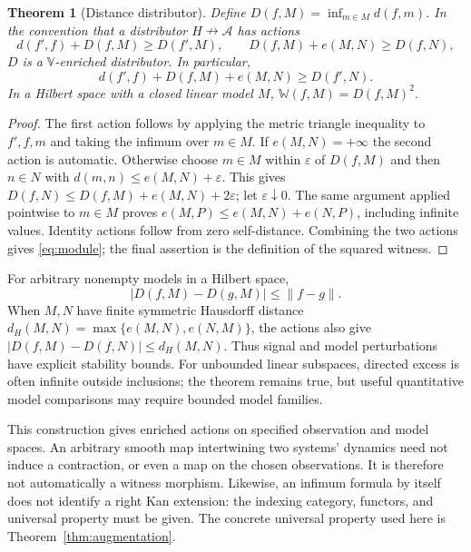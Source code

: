 \documentclass[11pt,letterpaper]{article}
\newtheorem{theorem}{Theorem}[section]
\newcommand{\WW}{\mathbb W}
\begin{document}
\begin{theorem}[Distance distributor]\label{thm:distributor}
Define $D(f,M)=\inf_{m\in M}d(f,m)$. In the convention that a distributor
$H\nrightarrow\mathcal A$ has actions
\[
d(f',f)+D(f,M)\ge D(f',M),\qquad
D(f,M)+e(M,N)\ge D(f,N),
\]
$D$ is a $\mathbb V$-enriched distributor. In particular,
\begin{equation}\label{eq:module}
d(f',f)+D(f,M)+e(M,N)\ge D(f',N).
\end{equation}
In a Hilbert space with a closed linear model $M$, $\WW(f,M)=D(f,M)^2$.
\end{theorem}
\begin{proof}
The first action follows by applying the metric triangle inequality to
$f',f,m$ and taking the infimum over $m\in M$.
If $e(M,N)=+\infty$ the second action is automatic. Otherwise choose
$m\in M$ within $\varepsilon$ of $D(f,M)$ and then $n\in N$ with
$d(m,n)\le e(M,N)+\varepsilon$. This gives
$D(f,N)\le D(f,M)+e(M,N)+2\varepsilon$; let $\varepsilon\downarrow0$.
The same argument applied pointwise to $m\in M$ proves
$e(M,P)\le e(M,N)+e(N,P)$, including infinite values.
Identity actions follow from zero self-distance. Combining the two
actions gives \eqref{eq:module}; the final assertion is the definition
of the squared witness.
\end{proof}

For arbitrary nonempty models in a Hilbert space,
\[
|D(f,M)-D(g,M)|\le\|f-g\|.
\]
When $M,N$ have finite symmetric Hausdorff distance
$d_H(M,N)=\max\{e(M,N),e(N,M)\}$, the actions also give
$|D(f,M)-D(f,N)|\le d_H(M,N)$. Thus signal and model perturbations have
explicit stability bounds. For unbounded linear subspaces, directed
excess is often infinite outside inclusions; the theorem remains true,
but useful quantitative model comparisons may require bounded model
families.

This construction gives enriched actions on specified observation and
model spaces. An arbitrary smooth map intertwining two systems'
dynamics need not induce a contraction, or even a map on the chosen
observations. It is therefore not automatically a witness morphism.
Likewise, an infimum formula by itself does not identify a right Kan
extension: the indexing category, functors, and universal property must
be given. The concrete universal property used here is
Theorem~\ref{thm:augmentation}.
\end{document}
